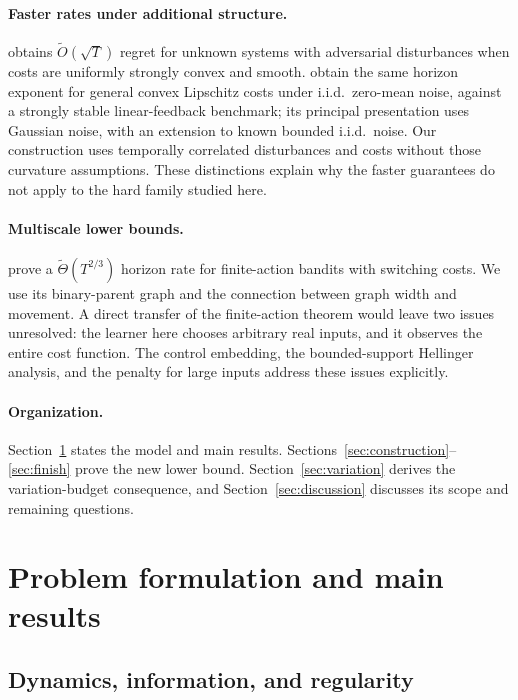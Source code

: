 \documentclass[11pt]{article}
\theoremstyle{remark}
\begin{document}
\paragraph{Faster rates under additional structure.}
\citet{simchowitzfast} obtains $\widetilde O(\sqrt T)$ regret for
unknown systems with adversarial disturbances when costs are uniformly
strongly convex and smooth. \citet{cassel} obtain the same horizon
exponent for general convex Lipschitz costs under i.i.d.\ zero-mean noise,
against a strongly stable linear-feedback benchmark; its principal
presentation uses Gaussian noise, with an extension to known bounded
i.i.d.\ noise. Our construction uses temporally correlated disturbances
and costs without those curvature assumptions. These distinctions explain
why the faster guarantees do not apply to the hard family studied here.

\paragraph{Multiscale lower bounds.}
\citet{dekel} prove a $\widetilde\Theta(T^{2/3})$ horizon rate for
finite-action bandits with switching costs. We use its binary-parent graph
and the connection between graph width and movement. A direct transfer of
the finite-action theorem would leave two issues unresolved: the learner
here chooses arbitrary real inputs, and it observes the entire cost
function. The control embedding, the bounded-support Hellinger analysis,
and the penalty for large inputs address these issues explicitly.

\paragraph{Organization.}
Section~\ref{sec:model} states the model and main results.
Sections~\ref{sec:construction}--\ref{sec:finish} prove the new lower bound.
Section~\ref{sec:variation} derives the variation-budget consequence,
and Section~\ref{sec:discussion} discusses its scope and remaining questions.

\section{Problem formulation and main results}\label{sec:model}

\subsection{Dynamics, information, and regularity}
\end{document}
